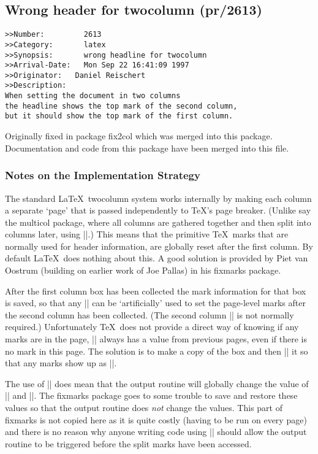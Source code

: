\documentclass{ltxguide}
\newcommand\Lpack[1]{\textsf{#1}}
\begin{document}
\subsection{Wrong header for twocolumn (pr/2613)}

\begin{verbatim}
>>Number:         2613
>>Category:       latex
>>Synopsis:       wrong headline for twocolumn
>>Arrival-Date:   Mon Sep 22 16:41:09 1997
>>Originator:   Daniel Reischert
>>Description:
When setting the document in two columns
the headline shows the top mark of the second column,
but it should show the top mark of the first column.
\end{verbatim}

Originally fixed in package \Lpack{fix2col} which was merged into
this package. Documentation and code from this package have been
merged into this file.

\subsubsection{Notes on the Implementation Strategy}

The standard \LaTeX\ twocolumn system works internally by making
each column a separate `page' that is passed independently to \TeX's
page breaker. (Unlike say the \Lpack{multicol} package, where all
columns are gathered together and then split into columns later,
using |\vsplit|.) This means that the primitive \TeX\ marks that are
normally used for header information, are globally reset after the
first column. By default \LaTeX\ does nothing about this.
A good solution is provided by Piet van Oostrum (building on earlier
work of Joe Pallas) in his \Lpack{fixmarks} package.

After the first column box has been collected the mark information
for that box is saved, so that any |\firstmark| can be
`artificially' used to set the page-level marks after the second
column has been collected. (The second column |\firstmark| is not
normally required.) Unfortunately \TeX\ does not provide a direct
way of knowing if any marks are in the page, |\firstmark| always has a
value from previous pages, even if there is no mark in this page.
The solution is to make a copy of the box and then |\vsplit| it
so that any marks show up as |\splitfirstmark|.

The use of |\vsplit| does mean that the output routine will globally
change the value of |\splitfirstmark| and
|\splitbotmark|. The \Lpack{fixmarks} package goes to some trouble
to save and restore these values so that the output routine does
\emph{not} change the values. This part of \Lpack{fixmarks} is not
copied here as it is quite costly (having to be run on every page) and
there is no reason why anyone writing code using |\vsplit| should
allow the output routine to be triggered before the split marks have
been accessed.
\end{document}
